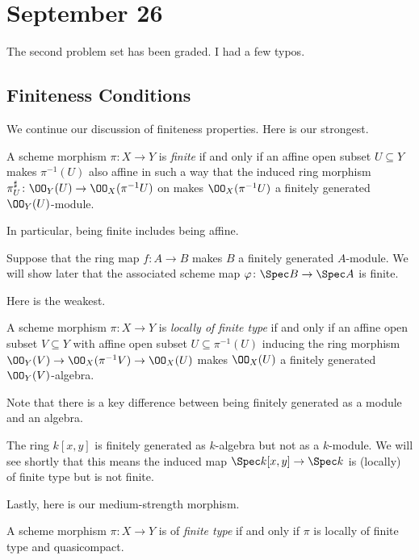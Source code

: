 \documentclass[../notes.tex]{subfiles}
\begin{document}
\section{September 26}

The second problem set has been graded. I had a few typos.

\subsection{Finiteness Conditions}
We continue our discussion of finiteness properties. Here is our strongest.
\begin{definition}[Finite]
	A scheme morphism $\pi\colon X\to Y$ is \textit{finite} if and only if an affine open subset $U\subseteq Y$ makes $\pi^{-1}(U)$ also affine in such a way that the induced ring morphism $\pi^\sharp_U\colon\OO_Y(U)\to\OO_X(\pi^{-1}U)$ on makes $\OO_X(\pi^{-1}U)$ a finitely generated $\OO_Y(U)$-module.
\end{definition}
In particular, being finite includes being affine.
\begin{example}
	Suppose that the ring map $f\colon A\to B$ makes $B$ a finitely generated $A$-module. We will show later that the associated scheme map $\varphi\colon\Spec B\to\Spec A$ is finite.
\end{example}
Here is the weakest.
\begin{definition}
	A scheme morphism $\pi\colon X\to Y$ is \textit{locally of finite type} if and only if an affine open subset $V\subseteq Y$ with affine open subset $U\subseteq\pi^{-1}(U)$ inducing the ring morphism $\OO_Y(V)\to\OO_X(\pi^{-1}V)\to\OO_X(U)$ makes $\OO_X(U)$ a finitely generated $\OO_Y(V)$-algebra.
\end{definition}
Note that there is a key difference between being finitely generated as a module and an algebra.
\begin{example}
	The ring $k[x,y]$ is finitely generated as $k$-algebra but not as a $k$-module. We will see shortly that this means the induced map $\Spec k[x,y]\to\Spec k$ is (locally) of finite type but is not finite.
\end{example}
Lastly, here is our medium-strength morphism.
\begin{definition}
	A scheme morphism $\pi\colon X\to Y$ is of \textit{finite type} if and only if $\pi$ is locally of finite type and quasicompact.
\end{definition}
\end{document}

